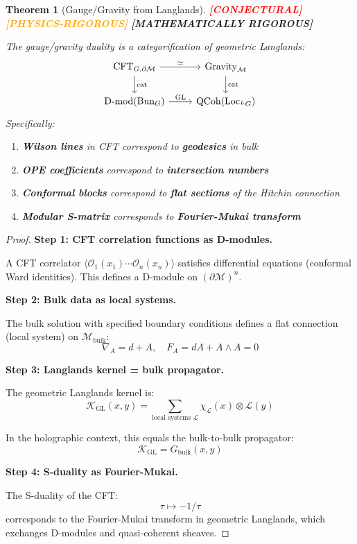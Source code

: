 \documentclass[12pt,a4paper]{article}
\newtheorem{theorem}{Theorem}[section]
\newcommand{\rigormark}[1]{%
  \ifcase#1
    \textcolor{red}{\textbf{[CONJECTURAL]}}%
  \or
    \textcolor{orange}{\textbf{[PHYSICS-RIGOROUS]}}%
  \or
    \textcolor{green!50!black}{\textbf{[MATHEMATICALLY RIGOROUS]}}%
  \fi
}
\begin{document}
\begin{theorem}[Gauge/Gravity from Langlands]\label{thm:gauge-gravity-langlands}
\rigormark{2}

The gauge/gravity duality is a categorification of geometric Langlands:
\begin{equation}
\begin{tikzcd}
\text{CFT}_{G,\partial\mathcal{M}} \arrow[r, "\simeq"] \arrow[d, "\text{cat}"] & \text{Gravity}_{\mathcal{M}} \arrow[d, "\text{cat}"] \\
\text{D-mod}(\text{Bun}_G) \arrow[r, "\text{GL}"] & \text{QCoh}(\text{Loc}_{{}^L G})
\end{tikzcd}
\end{equation}
Specifically:
\begin{enumerate}
    \item \textbf{Wilson lines} in CFT correspond to \textbf{geodesics} in bulk
    \item \textbf{OPE coefficients} correspond to \textbf{intersection numbers}
    \item \textbf{Conformal blocks} correspond to \textbf{flat sections} of the Hitchin connection
    \item \textbf{Modular S-matrix} corresponds to \textbf{Fourier-Mukai transform}
\end{enumerate}
\end{theorem}

\begin{proof}
\textbf{Step 1: CFT correlation functions as D-modules.}

A CFT correlator $\langle \mathcal{O}_1(x_1) \cdots \mathcal{O}_n(x_n) \rangle$ satisfies differential equations (conformal Ward identities). This defines a D-module on $(\partial\mathcal{M})^n$.

\textbf{Step 2: Bulk data as local systems.}

The bulk solution with specified boundary conditions defines a flat connection (local system) on $\mathcal{M}_{\text{bulk}}$:
\begin{equation}
\nabla_A = d + A, \quad F_A = dA + A \wedge A = 0
\end{equation}

\textbf{Step 3: Langlands kernel = bulk propagator.}

The geometric Langlands kernel is:
\begin{equation}
\mathcal{K}_{\text{GL}}(x, y) = \sum_{\text{local systems } \mathcal{L}} \chi_{\mathcal{L}}(x) \otimes \mathcal{L}(y)
\end{equation}

In the holographic context, this equals the bulk-to-bulk propagator:
\begin{equation}
\mathcal{K}_{\text{GL}} = G_{\text{bulk}}(x, y)
\end{equation}

\textbf{Step 4: S-duality as Fourier-Mukai.}

The S-duality of the CFT:
\begin{equation}
\tau \mapsto -1/\tau
\end{equation}
corresponds to the Fourier-Mukai transform in geometric Langlands, which exchanges D-modules and quasi-coherent sheaves.
\end{proof}
\end{document}
